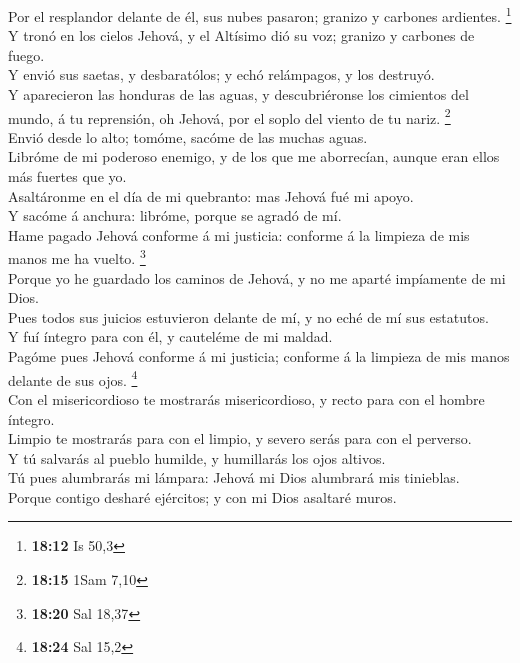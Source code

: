  Por el resplandor delante de él, sus nubes pasaron;
granizo y carbones ardientes. \footnote{\textbf{18:12} Is 50,3}\\
 Y tronó en los cielos Jehová, y el Altísimo dió su voz;
granizo y carbones de fuego.\\
 Y envió sus saetas, y desbaratólos; y echó relámpagos, y
los destruyó.\\
 Y aparecieron las honduras de las aguas, y
descubriéronse los cimientos del mundo, á tu reprensión, oh Jehová, por
el soplo del viento de tu nariz. \footnote{\textbf{18:15} 1Sam 7,10}\\
 Envió desde lo alto; tomóme, sacóme de las muchas
aguas.\\
 Libróme de mi poderoso enemigo, y de los que me
aborrecían, aunque eran ellos más fuertes que yo.\\
 Asaltáronme en el día de mi quebranto: mas Jehová fué mi
apoyo.\\
 Y sacóme á anchura: libróme, porque se agradó de mí.\\
 Hame pagado Jehová conforme á mi justicia: conforme á la
limpieza de mis manos me ha vuelto. \footnote{\textbf{18:20} Sal 18,37}\\
 Porque yo he guardado los caminos de Jehová, y no me
aparté impíamente de mi Dios.\\
 Pues todos sus juicios estuvieron delante de mí, y no
eché de mí sus estatutos.\\
 Y fuí íntegro para con él, y cauteléme de mi maldad.\\
 Pagóme pues Jehová conforme á mi justicia; conforme á la
limpieza de mis manos delante de sus ojos. \footnote{\textbf{18:24} Sal
  15,2}\\
 Con el misericordioso te mostrarás misericordioso, y
recto para con el hombre íntegro.\\
 Limpio te mostrarás para con el limpio, y severo serás
para con el perverso.\\
 Y tú salvarás al pueblo humilde, y humillarás los ojos
altivos.\\
 Tú pues alumbrarás mi lámpara: Jehová mi Dios alumbrará
mis tinieblas.\\
 Porque contigo desharé ejércitos; y con mi Dios asaltaré
muros.\\
